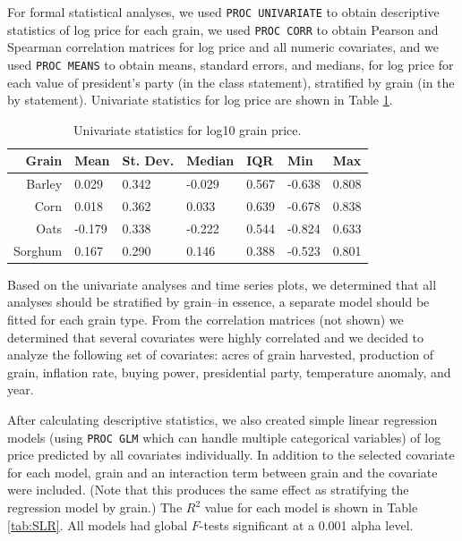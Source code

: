 \documentclass[11pt]{article}
\begin{document}
For formal statistical analyses, we used \texttt{PROC UNIVARIATE} to obtain
descriptive statistics of log price for each grain, we used \texttt{PROC CORR}
to obtain Pearson and Spearman correlation matrices for log price and all
numeric covariates, and we used \texttt{PROC MEANS} to obtain means, standard
errors, and medians, for log price for each value of president's party (in the
class statement), stratified by grain (in the by statement). Univariate
statistics for log price are shown in Table \ref{tab:univar}.

\begin{table}
	\centering
	\begin{tabular}{rllllll}
		\toprule
		Grain & Mean & St. Dev. & Median & IQR & Min & Max \\
		\midrule
		Barley & 0.029 & 0.342 & -0.029 & 0.567 & -0.638 & 0.808 \\
		Corn & 0.018 & 0.362 & 0.033 & 0.639 & -0.678 & 0.838 \\
		Oats & -0.179 & 0.338 & -0.222 & 0.544 & -0.824 & 0.633 \\
		Sorghum & 0.167 & 0.290 & 0.146 & 0.388 & -0.523 & 0.801 \\
		\bottomrule
	\end{tabular}
	\caption{Univariate statistics for log10 grain price.}
	\label{tab:univar}
\end{table}

Based on the univariate analyses and time series plots, we determined that all
analyses should be stratified by grain--in essence, a separate model should be
fitted for each grain type. From the correlation matrices (not shown) we
determined that several covariates were highly correlated and we decided to
analyze the following set of covariates: acres of grain harvested, production
of grain, inflation rate, buying power, presidential party, temperature
anomaly, and year.

After calculating descriptive statistics, we also created simple linear
regression models (using \texttt{PROC GLM} which can handle multiple
categorical variables) of log price predicted by all covariates individually.
In addition to the selected covariate for each model, grain and an interaction
term between grain and the covariate were included. (Note that this produces
the same effect as stratifying the regression model by grain.) The $R^2$ value
for each model is shown in Table \ref{tab:SLR}. All models had global $F$-tests
significant at a 0.001 alpha level.
\end{document}
